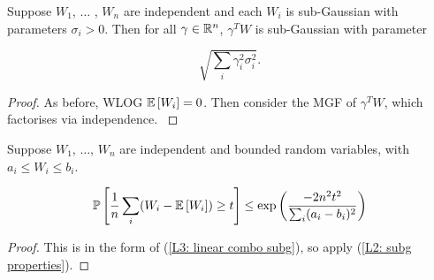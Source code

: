 \documentclass[11pt]{scrartcl}
\begin{document}
\begin{theorem}
    Suppose $W_1$, $\dots$ , $W_n$ are independent and each $W_i$ is sub-Gaussian with parameters $\sigma_i > 0$. Then for all $\gamma \in \mathbb R^n$, $\gamma^T W$ is sub-Gaussian with parameter
    
    \begin{equation}
        \sqrt{\sum_i \gamma_i^2 \sigma_i^2}.
    \end{equation}
\begin{proof}
As before, WLOG $\mathbb{E} \left[ W_i \right]=0$. Then consider the MGF of $\gamma^T W$, which factorises via independence.
\label{Lecture ? Linear Combo}
    

\end{proof}
\label{L3: linear combo subg}
\end{theorem}

\begin{theorem}
Suppose $W_1$, $\dots$, $W_n$ are independent and bounded random variables, with $a_i \le W_i \le b_i$.

\label{Hoeffding's Inequality}

\begin{equation}
    \mathbb{P} \left[ \frac1n \sum_i (W_i - \mathbb{E} \left[ W_i \right]) \ge t \right] \le \text{exp} \left( \frac{-2 n^2 t^2}{\sum_i (a_i - b_i)^2} \right)
\end{equation}

\begin{proof}
This is in the form of (\ref{L3: linear combo subg}), so apply (\ref{L2: subg properties}).
\end{proof}
\end{theorem}
\end{document}
